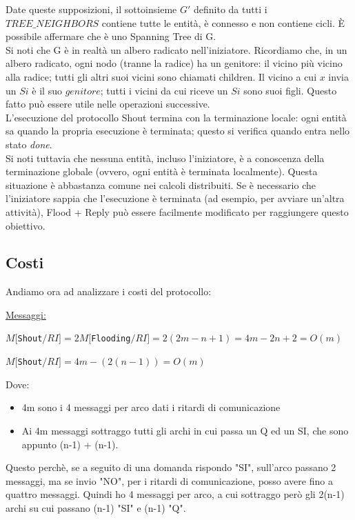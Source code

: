 Date queste supposizioni, il sottoinsieme $G'$ definito da tutti i
$TREE\_NEIGHBORS$ contiene tutte le entità, è connesso e non contiene cicli. È
possibile affermare che è uno Spanning Tree di G.\\
Si noti che G è in realtà un albero radicato nell'iniziatore. Ricordiamo che, in
un albero radicato, ogni nodo (tranne la radice) ha un genitore: il vicino più
vicino alla radice; tutti gli altri suoi vicini sono chiamati children. Il
vicino a cui $x$ invia un $Si$ è il suo $genitore$; tutti i vicini da cui riceve
un $Si$ sono suoi figli. Questo fatto può essere utile nelle operazioni
successive.\\
L'esecuzione del protocollo Shout termina con la terminazione locale: ogni
entità sa quando la propria esecuzione è terminata; questo si verifica quando
entra nello stato \textit{done}.\\
Si noti tuttavia che nessuna entità, incluso l'iniziatore, è a conoscenza della
terminazione globale (ovvero, ogni entità è terminata localmente). Questa
situazione è abbastanza comune nei calcoli distribuiti. Se è necessario che
l'iniziatore sappia che l'esecuzione è terminata (ad esempio, per avviare
un'altra attività), Flood + Reply può essere facilmente modificato per
raggiungere questo obiettivo.

\subsection{Costi}
Andiamo ora ad analizzare i costi del protocollo:

\underline{Messaggi:}
\begin{center}
    $M[$\texttt{Shout}$/RI] = 2 M[$\texttt{Flooding}$/RI] = 2(2m-n+1) = 4m - 2n +
        2 = O(m)$
\end{center}
\begin{center}
    $M[$\texttt{Shout}$/RI] = 4m - (2(n-1)) = O(m)$
\end{center}
Dove:
\begin{itemize}
    \item 4m sono i 4 messaggi per arco dati i ritardi di comunicazione
    \item Ai 4m messaggi sottraggo tutti gli archi in cui passa un Q ed un SI, che
          sono appunto (n-1) + (n-1).
\end{itemize}

Questo perchè, se a seguito di una domanda rispondo "SI", sull'arco passano 2
messaggi, ma se invio "NO", per i ritardi di comunicazione, posso avere fino a
quattro messaggi. Quindi ho 4 messaggi per arco, a cui sottraggo però gli 2(n-1)
archi su cui passano (n-1) "SI" e (n-1) "Q".

